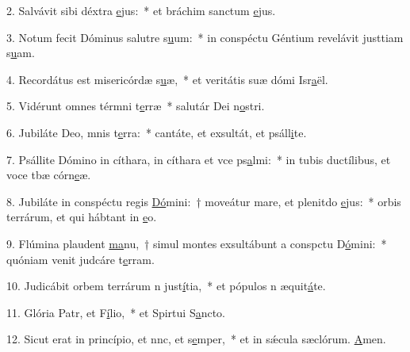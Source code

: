 2. Salvávit sibi déxtra \uline{e}jus:~* et bráchim sanctum \uline{e}jus.\par 
3. Notum fecit Dóminus salutre s\uline{u}um:~* in conspéctu Géntium revelávit justtiam s\uline{u}am.\par 
4. Recordátus est misericórdæ s\uline{u}æ,~* et veritátis suæ dómi Isr\uline{a}ël.\par 
5. Vidérunt omnes térmni t\uline{e}rræ~* salutár Dei n\uline{o}stri.\par 
6. Jubiláte Deo, mnis t\uline{e}rra:~* cantáte, et exsultát, et psáll\uline{i}te.\par 
7. Psállite Dómino in cíthara, in cíthara et vce ps\uline{a}lmi:~* in tubis ductílibus, et voce tbæ córn\uline{e}æ.\par 
8. Jubiláte in conspéctu regis \uline{Dó}mini:~† moveátur mare, et plenitdo \uline{e}jus:~* orbis terrárum, et qui hábtant in \uline{e}o.\par 
9. Flúmina plaudent \uline{ma}nu,~† simul montes exsultábunt a conspctu D\uline{ó}mini:~* quóniam venit judcáre t\uline{e}rram.\par 
10. Judicábit orbem terrárum n just\uline{í}tia,~* et pópulos n æquit\uline{á}te.\par 
11. Glória Patr, et F\uline{í}lio,~* et Spirtui S\uline{a}ncto.\par 
12. Sicut erat in princípio, et nnc, et s\uline{e}mper,~* et in sǽcula sæclórum. \uline{A}men.\par 
